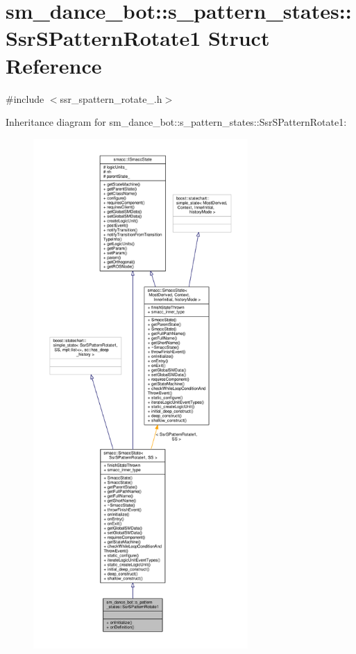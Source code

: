 \hypertarget{structsm__dance__bot_1_1s__pattern__states_1_1SsrSPatternRotate1}{}\section{sm\+\_\+dance\+\_\+bot\+:\+:s\+\_\+pattern\+\_\+states\+:\+:Ssr\+S\+Pattern\+Rotate1 Struct Reference}
\label{structsm__dance__bot_1_1s__pattern__states_1_1SsrSPatternRotate1}


{\ttfamily \#include $<$ssr\+\_\+spattern\+\_\+rotate\+\_.\+h$>$}



Inheritance diagram for sm\+\_\+dance\+\_\+bot\+:\+:s\+\_\+pattern\+\_\+states\+:\+:Ssr\+S\+Pattern\+Rotate1\+:\nopagebreak
\begin{figure}[H]
\begin{center}
\leavevmode
\includegraphics[height=550pt]{structsm__dance__bot_1_1s__pattern__states_1_1SsrSPatternRotate1__inherit__graph}
\end{center}
\end{figure}



